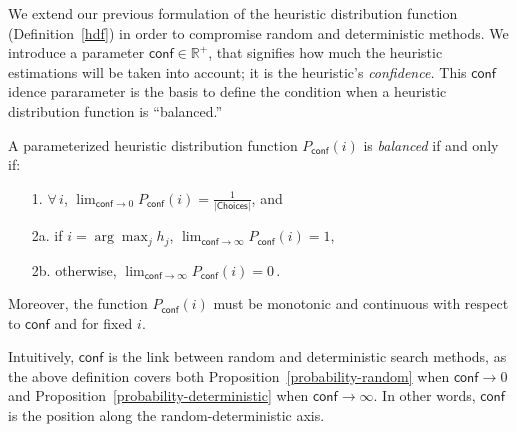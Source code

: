 \documentclass{ws-ijait}
\begin{document}
We extend our previous formulation of the heuristic
distribution function (Definition~\ref{hdf}) in order to
compromise random and deterministic methods. We introduce a
parameter $\mathsf{conf} \in \mathbb{R}^+$, that signifies
how much the heuristic estimations will be taken into
account; it is the heuristic's \emph{confidence.} This
$\mathsf{conf}$idence pararameter is the basis to define the
condition when a heuristic distribution function is
``balanced.''
\begin{definition}
  \label{balanced}
  A parameterized heuristic distribution function
  $P_\mathsf{conf} (i)$ is \emph{balanced} if and only if:
  \begin{enumerate}
    \item[1.] $\forall \, i$, ${\displaystyle
              \lim_{\mathsf{conf} \to 0} } \!\!
              P_\mathsf{conf} (i) =
              \frac{1}{|\mathsf{Choices}|}$, and
    \item[2a.] if $i = \arg\max_j h_j$, ${\displaystyle
               \lim_{\mathsf{conf} \to \infty} } \!\!\!\!
               P_\mathsf{conf} (i) = 1$,
    \item[2b.] otherwise, ${\displaystyle
               \lim_{\mathsf{conf} \to \infty} } \!\!\!\!
               P_\mathsf{conf} (i) = 0 \,$.
  \end{enumerate}
  Moreover, the function $P_\mathsf{conf} (i)$ must be
  monotonic and continuous with respect to $\mathsf{conf}$
  and for fixed $i$.
\end{definition}
Intuitively, $\mathsf{conf}$ is the link between random and
deterministic search methods, as the above definition covers
both Proposition~\ref{probability-random} when
$\mathsf{conf} \to 0$ and
Proposition~\ref{probability-deterministic} when
$\mathsf{conf} \to \infty$. In other words, $\mathsf{conf}$
is the position along the random-deterministic axis.
\end{document}
